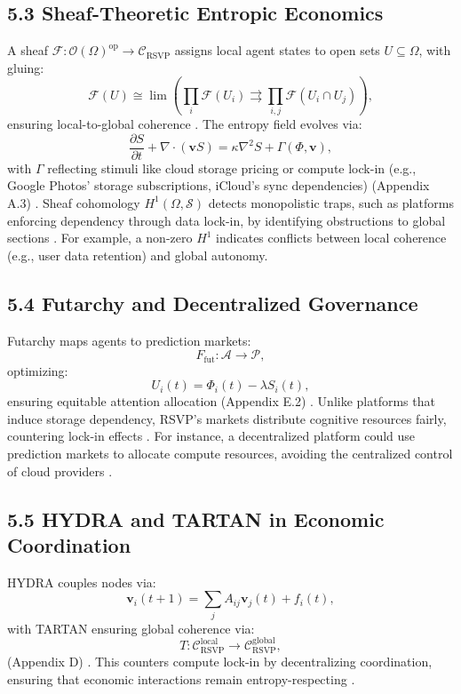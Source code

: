 \documentclass[12pt]{article}
\begin{document}
\subsection*{5.3 Sheaf-Theoretic Entropic Economics}

A sheaf \(\mathcal{F}: \mathcal{O}(\Omega)^{\text{op}} \to \mathcal{C}_{\text{RSVP}}\) assigns local agent states to open sets \(U \subseteq \Omega\), with gluing:
\[
\mathcal{F}(U) \cong \lim \left( \prod_i \mathcal{F}(U_i) \rightrightarrows \prod_{i,j} \mathcal{F}(U_i \cap U_j) \right),
\]
ensuring local-to-global coherence \citep{maclane1998}. The entropy field evolves via:
\[
\frac{\partial S}{\partial t} + \nabla \cdot (\mathbf{v} S) = \kappa \nabla^2 S + \Gamma(\Phi, \mathbf{v}),
\]
with \(\Gamma\) reflecting stimuli like cloud storage pricing or compute lock-in (e.g., Google Photos’ storage subscriptions, iCloud’s sync dependencies) (Appendix A.3) \citep{cover2006, zuboff2019}. Sheaf cohomology \(H^1(\Omega, \mathcal{S})\) detects monopolistic traps, such as platforms enforcing dependency through data lock-in, by identifying obstructions to global sections \citep{hatcher2002}. For example, a non-zero \(H^1\) indicates conflicts between local coherence (e.g., user data retention) and global autonomy.

\subsection*{5.4 Futarchy and Decentralized Governance}

Futarchy maps agents to prediction markets:
\[
F_{\text{fut}}: \mathcal{A} \to \mathcal{P},
\]
optimizing:
\[
U_i(t) = \Phi_i(t) - \lambda S_i(t),
\]
ensuring equitable attention allocation (Appendix E.2) \citep{hanson2003}. Unlike platforms that induce storage dependency, RSVP’s markets distribute cognitive resources fairly, countering lock-in effects \citep{zuboff2019}. For instance, a decentralized platform could use prediction markets to allocate compute resources, avoiding the centralized control of cloud providers \citep{lanier2018}.

\subsection*{5.5 HYDRA and TARTAN in Economic Coordination}

HYDRA couples nodes via:
\[
\mathbf{v}_i(t+1) = \sum_j A_{ij} \mathbf{v}_j(t) + f_i(t),
\]
with TARTAN ensuring global coherence via:
\[
T: \mathcal{C}_{\text{RSVP}}^{\text{local}} \to \mathcal{C}_{\text{RSVP}}^{\text{global}},
\]
(Appendix D) \citep{bird1988}. This counters compute lock-in by decentralizing coordination, ensuring that economic interactions remain entropy-respecting \citep{milewski2018}.
\end{document}

